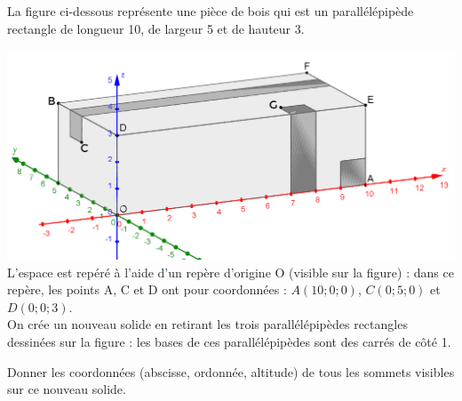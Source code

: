 
La figure ci-dessous représente une pièce de bois qui est un parallélépipède rectangle de
longueur 10, de largeur 5 et de hauteur 3.

\includegraphics[scale=0.22]{RepE-parallelepipedecoordonnees.png}\\ 

L’espace est repéré à l’aide d’un repère d’origine O (visible sur la figure) : dans ce repère, les
points A, C et D ont pour coordonnées : $A (10 ; 0 ; 0)$, $C (0 ; 5 ; 0)$ et $D (0 ; 0 ; 3)$.\\
On crée un nouveau solide en retirant les trois parallélépipèdes rectangles dessinées sur la
figure : les bases de ces parallélépipèdes sont des carrés de côté 1.

Donner les coordonnées (abscisse, ordonnée, altitude) de tous les sommets visibles sur ce nouveau solide.

